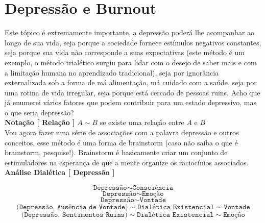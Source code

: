 
\section{Depressão e Burnout}

\hspace{\baselineskip}

Este tópico é extremamente importante, a depressão poderá lhe acompanhar ao longo de sua vida, seja porque a sociedade fornece estímulos negativos constantes, seja porque sua vida não corresponde a suas expectativas (este método é um exemplo, o método trialético surgiu para lidar com o desejo de saber mais e com a limitação humana no aprendizado tradicional), seja por ignorância externalizada sob a forma de má alimentação, má cuidado com a saúde, seja por uma rotina de vida irregular, seja porque está cercado de pessoas ruins. Acho que já enumerei vários fatores que podem contribuir para um estado depressivo, mas o que seria depressão? \\

\textbf{Notação [ Relação ]} $ A \sim B $ se existe uma relação entre $A$ e $B$\\

Vou agora fazer uma série de associações com a palavra depressão e outros conceitos, esse método é uma forma de brainstorm (caso não saiba o que é brainstorm, pesquise!). Brainstorm é basicamente criar um conjunto de estimuladores na esperança de que a mente organize os raciocínios associados.\\

\textbf{Análise Dialética [ Depressão ]}

$$ \texttt{Depressão} \sim \texttt{Consciência} $$
$$ \texttt{Depressão} \sim \texttt{Emoção} $$
$$ \texttt{Depressão} \sim \texttt{Vontade} $$
$$ \texttt{(Depressão, Ausência de Vontade)} \sim \texttt{Dialética Existencial} \sim \texttt{Vontade} $$
$$ \texttt{(Depressão, Sentimentos Ruins)} \sim \texttt{Dialética Existencial} \sim \texttt{Emoção} $$

